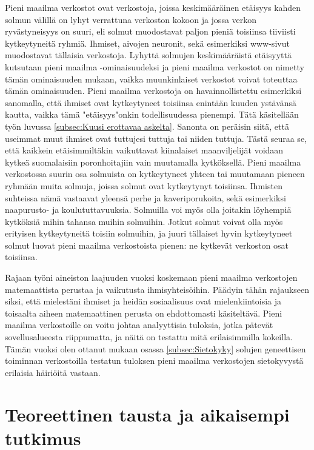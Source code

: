 \documentclass[finnish,12pt,a4paper,pdftex,elec,utf8]{aaltothesis}
\begin{document}
Pieni maailma verkostot ovat verkostoja, joissa keskimääräinen etäisyys kahden solmun välillä on lyhyt verrattuna verkoston kokoon ja jossa verkon ryvästyneisyys on suuri, eli solmut muodostavat paljon pieniä toisiinsa tiiviisti kytkeytyneitä ryhmiä. Ihmiset, aivojen neuronit, sekä esimerkiksi www-sivut muodostavat tällaisia verkostoja. Lyhyttä solmujen keskimääräistä etäisyyttä kutsutaan pieni maailma -ominaisuudeksi ja pieni maailma verkostot on nimetty tämän ominaisuuden mukaan, vaikka muunkinlaiset verkostot voivat toteuttaa tämän ominaisuuden. Pieni maailma verkostoja on havainnollistettu esimerkiksi sanomalla, että ihmiset ovat kytkeytyneet toisiinsa enintään kuuden ystävänsä kautta, vaikka tämä "etäisyys"\space onkin todellisuudessa pienempi. Tätä käsitellään työn luvussa \ref{subsec:Kuusi erottavaa askelta}. Sanonta on peräisin siitä, että useimmat muut ihmiset ovat tuttujesi tuttuja tai niiden tuttuja. Tästä seuraa se, että kaikkein etäisimmiltäkin vaikuttavat kiinalaiset maanviljelijät voidaan kytkeä suomalaisiin poronhoitajiin vain muutamalla kytköksellä. Pieni maailma verkostossa suurin osa solmuista on kytkeytyneet yhteen tai muutamaan pieneen ryhmään muita solmuja, joissa solmut ovat kytkeytynyt toisiinsa. Ihmisten suhteissa nämä vastaavat yleensä perhe ja kaveriporukoita, sekä esimerkiksi naapurusto- ja koulututtavuuksia. Solmuilla voi myös olla joitakin löyhempiä kytköksiä mihin tahansa muihin solmuihin. Jotkut solmut voivat olla myös erityisen kytkeytyneitä toisiin solmuihin, ja juuri tällaiset hyvin kytkeytyneet solmut luovat pieni maailma verkostoista pienen: ne kytkevät verkoston osat toisiinsa.

Rajaan työni aineiston laajuuden vuoksi koskemaan pieni maailma verkostojen matemaattista perustaa ja vaikutusta ihmisyhteisöihin. Päädyin tähän rajaukseen siksi, että mielestäni ihmiset ja heidän sosiaalisuus ovat mielenkiintoisia ja toisaalta aiheen matemaattinen perusta on ehdottomasti käsiteltävä. Pieni maailma verkostoille on voitu johtaa analyyttisia tuloksia, jotka pätevät sovellusalueesta riippumatta, ja näitä on testattu mitä erilaisimmilla kokeilla. Tämän vuoksi olen ottanut mukaan osassa \ref{subsec:Sietokyky}  solujen geneettisen toiminnan verkostoilla testatun tuloksen pieni maailma verkostojen sietokyvystä erilaisia häiriöitä vastaan.


\clearpage

\section{Teoreettinen tausta ja aikaisempi tutkimus}
\end{document}
